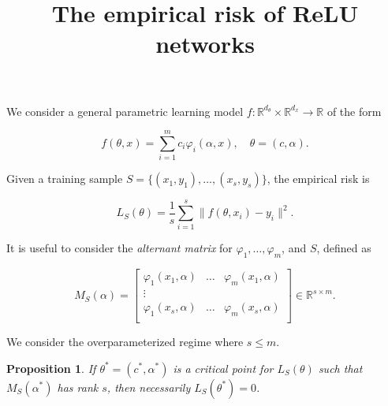 \documentclass{article}
\title{{\bf The empirical risk of ReLU networks}}
\author{}
\date{}
\newtheorem{proposition}[theorem]{Proposition}
\newcommand{\RR}{\mathbb{R}}
\begin{document}
\maketitle

We consider a general parametric learning model
$f: \RR^{d_\theta} \times \RR^{d_x} \rightarrow \RR$
of the form

\begin{equation}
 f(\theta,x) = \sum_{i=1}^m c_i \varphi_i(\alpha,x), \quad \theta = (c,\alpha).
\end{equation}

Given a training sample $S = \{(x_1,y_1),\ldots,(x_s,y_s)\}$, the
empirical risk is

\begin{equation}
L_S(\theta) = \frac 1 s \sum_{i=1}^s \|f(\theta,x_i) - y_i\|^2.
\end{equation}

It is useful to consider the \emph{alternant matrix}
for $\varphi_1,\ldots,\varphi_m$, and $S$, defined as

\begin{equation}
M_S(\alpha) = \begin{bmatrix}
\varphi_1(x_1,\alpha) & \ldots & \varphi_m(x_1,\alpha)\\
\vdots \\
\varphi_1(x_s,\alpha) & \ldots & \varphi_m(x_s,\alpha)\\
\end{bmatrix} \in \RR^{s \times m}.
\end{equation}

We consider the overparameterized regime where $s \le m$.

\begin{proposition} If $\theta^* = (c^*,\alpha^*)$ is a critical
point for $L_S(\theta)$ such that $M_S(\alpha^*)$ has rank $s$,
then necessarily $L_S(\theta^*) = 0$.
\end{proposition}
\end{document}
